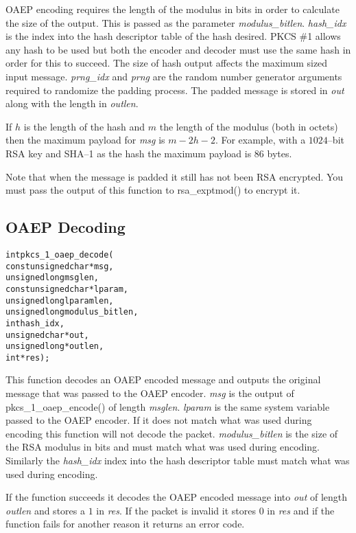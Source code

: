\documentclass[synpaper]{book}
\begin{document}
OAEP encoding requires the length of the modulus in bits in order to calculate the size of the output.  This is passed as the parameter
\textit{modulus\_bitlen}.  \textit{hash\_idx} is the index into the hash descriptor table of the hash desired.  PKCS \#1 allows any hash to be 
used but both the encoder and decoder must use the same hash in order for this to succeed.  The size of hash output affects the maximum
 sized input message.  \textit{prng\_idx} and \textit{prng} are the random number generator arguments required to randomize the padding process.  
The padded message is stored in \textit{out} along with the length in \textit{outlen}.

If $h$ is the length of the hash and $m$ the length of the modulus (both in octets) then the maximum payload for \textit{msg} is 
$m - 2h - 2$.  For example, with a $1024$--bit RSA key and SHA--1 as the hash the maximum payload is $86$ bytes.  

Note that when the message is padded it still has not been RSA encrypted.  You must pass the output of this function to 
rsa\_exptmod() to encrypt it. 

\subsection{OAEP Decoding}

\begin{alltt}
int pkcs_1_oaep_decode(
    const unsigned char *msg,    
          unsigned long  msglen,
    const unsigned char *lparam, 
          unsigned long  lparamlen,
          unsigned long  modulus_bitlen, 
                    int  hash_idx,
          unsigned char *out,    
          unsigned long *outlen,
                    int *res);
\end{alltt}

This function decodes an OAEP encoded message and outputs the original message that was passed to the OAEP encoder.  \textit{msg} is the 
output of pkcs\_1\_oaep\_encode() of length \textit{msglen}.  \textit{lparam} is the same system variable passed to the OAEP encoder.  If it does not
match what was used during encoding this function will not decode the packet.  \textit{modulus\_bitlen} is the size of the RSA modulus in bits
and must match what was used during encoding.  Similarly the \textit{hash\_idx} index into the hash descriptor table must match what was used
during encoding.

If the function succeeds it decodes the OAEP encoded message into \textit{out} of length \textit{outlen} and stores a 
$1$ in \textit{res}.  If the packet is invalid it stores $0$ in \textit{res} and if the function fails for another reason
it returns an error code.  
\end{document}
